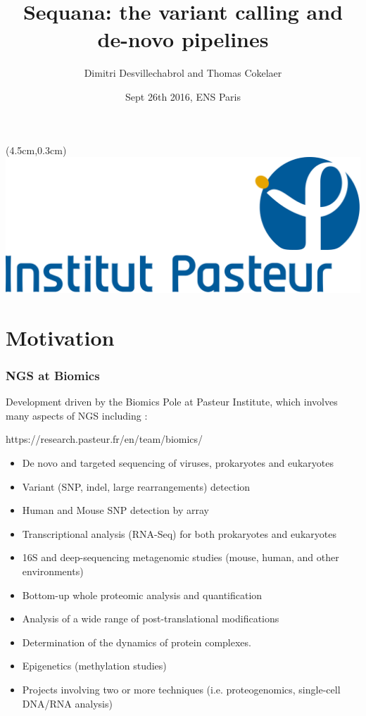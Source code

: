 \documentclass{beamer}
\title{Sequana: the variant calling and de-novo pipelines }
\author[T.Cokelaer \& D.Desvillechabrol]{Dimitri Desvillechabrol
and Thomas Cokelaer}
\institute{Institut Pasteur}
\date{Sept 26th 2016, ENS Paris}
\begin{document}

\begin{frame}[plain]
    \titlepage
    \begin{textblock*}{5cm}(4.5cm,0.3cm)
        \includegraphics[scale=0.09]{images/Institut_Pasteur.png}
    \end{textblock*}
\end{frame}


\section{Motivation}

\begin{frame}
 \frametitle{NGS at Biomics}
 
 Development driven by the Biomics Pole at Pasteur Institute, which involves
 many aspects of NGS including :
 
 \tiny
 \begin{block}{https://research.pasteur.fr/en/team/biomics/}
  \begin{itemize}
  \item De novo and targeted sequencing of viruses, prokaryotes and eukaryotes
  \item Variant (SNP, indel, large rearrangements) detection
  \item Human and Mouse SNP detection by array
  \item Transcriptional analysis (RNA-Seq) for both prokaryotes and eukaryotes
  \item 16S and deep-sequencing metagenomic studies (mouse, human, and other environments)
  \item Bottom-up whole proteomic analysis and quantification
  \item Analysis of a wide range of post-translational modifications
  \item Determination of the dynamics of protein complexes.
  \item Epigenetics (methylation studies)
  \item Projects involving two or more techniques (i.e. proteogenomics, single-cell DNA/RNA analysis)
  \end{itemize}
 \end{block}
 \small 
\end{frame}
\end{document}
